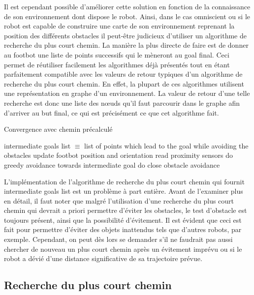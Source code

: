 Il est cependant possible d'améliorer cette solution en fonction de la connaissance de son environnement dont dispose le robot. Ainsi, dans le cas omniscient ou si le robot est capable de construire une carte de son environnement reprenant la position des différents obstacles il peut-être judicieux d'utiliser un algorithme de recherche du plus court chemin. La manière la plus directe de faire est de donner au footbot une liste de points successifs qui le mèneront au goal final. Ceci  permet de réutiliser facilement les algorithmes déjà présentés tout en étant parfaitement compatible avec les valeurs de retour typiques d'un algorithme de recherche du plus court chemin. En effet, la plupart de ces algorithmes utilisent une représentation en graphe d'un environnement. La valeur de retour d'une telle recherche est donc une liste des nœuds qu'il faut parcourir dans le graphe afin d'arriver au but final, ce qui est précisément ce que cet algorithme fait.
\begin{algorithm}
\caption{Convergence avec chemin précalculé}
\label{pathConvergence}
\begin{algorithmic}
  \REQUIRE intermediate goals list $\equiv$ list of points which lead to the goal while avoiding the obstacles
    \STATE update footbot position and orientation
    \STATE read proximity sensors 
      \STATE do greedy avoidance towards intermediate goal
    \ELSE
      \STATE do close obstacle avoidance
    \ENDIF
  \ENDWHILE
  \ENDFOR
\end{algorithmic}
\end{algorithm}

L'implémentation de l'algorithme de recherche du plus court chemin qui fournit intermediate goals list est un problème à part entière. Avant de l'examiner plus en détail, il faut noter que malgré l'utilisation d'une recherche du plus court chemin qui devrait a priori permettre d'éviter les obstacles, le test d'obstacle est toujours présent, ainsi que la possibilité d'évitement. Il est évident que ceci est fait pour permettre d'éviter des objets inattendus tels que d'autres robots, par exemple. Cependant, on peut dès lors se demander s'il ne faudrait pas aussi chercher de nouveau un plus court chemin après un évitement imprévu ou si le robot a dévié d'une distance significative de sa trajectoire prévue.

\subsection{Recherche du plus court chemin}

